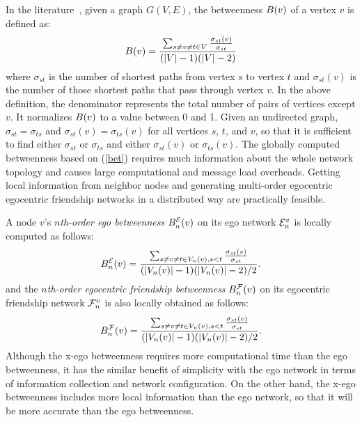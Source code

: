 In the literature~\cite{centrality, everett, Brandes01afaster}, given a graph $G(V, E)$, the betweenness $\B{v}$ of a vertex $v$ is defined as:
\begin{equation}\label{bet}
\B{v} = \frac{\sum_{s \neq v \neq t \in V}\frac{\sigma_{st}(v)}{\sigma_{st}}}{(|V|-1)(|V|-2)}
\end{equation} where $\sigma_{st}$ is the number of shortest paths from vertex $s$ to vertex $t$ and $\sigma_{st}(v)$ is the number of those shortest paths that pass through vertex $v$. 
In the above definition, the denominator represents the total number of pairs of vertices except $v$.
It normalizes $\B{v}$ to a value between 0 and 1.
Given an undirected graph, $\sigma_{st}=\sigma_{ts}$ and $\sigma_{st}(v)=\sigma_{ts}(v)$ for all vertices $s$, $t$, and $v$, so that it is sufficient to find either $\sigma_{st}$ or $\sigma_{ts}$ and either $\sigma_{st}(v)$ or $\sigma_{ts}(v)$.
The globally computed betweenness based on (\ref{bet}) requires much information about the whole network topology and causes large computational and message load overheads. 
Getting local information from neighbor nodes and generating multi-order egocentric egocentric friendship networks in a distributed way are practically feasible.
 
A node $v$'s \emph{$n$th-order ego betweenness} $\BE{n}{v}$ on its ego network $\ENN{n}{v}$ is locally computed as follows:\begin{equation}\label{ebet}
\BE{n}{v} = \frac{\sum_{s \neq v \neq t \in \V{v}{n}, s<t}\frac{\sigma_{st}(v)}{\sigma_{st}}}{(|\V{v}{n}|-1)(|\V{v}{n}|-2)/2}. 
\end{equation} and the \emph{$n$th-order egocentric friendship betweenness} $\BF{n}{v}$ on its egocentric friendship network $\FNN{n}{v}$ is also locally obtained as follows: \begin{equation}\label{eebet}
\BF{n}{v} = \frac{\sum_{s \neq v \neq t \in \V{v}{n}, s<t}\frac{\sigma_{st}(v)}{\sigma_{st}}}{(|\V{v}{n}|-1)(|\V{v}{n}|-2)/2}.
\end{equation} Although the x-ego betweenness requires more computational time than the ego betweenness, it has the similar benefit of simplicity with the ego network in terms of information collection and network configuration. On the other hand, the x-ego betweenness includes more local information than the ego network, so that it will be more accurate than the ego betweenness. 

